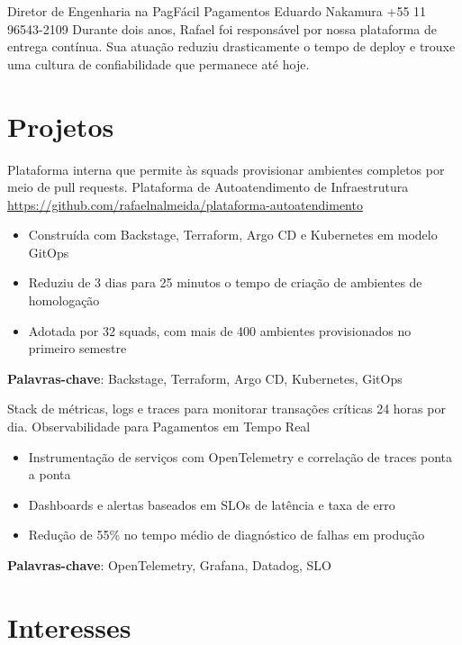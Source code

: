 \documentclass[a4paper, serif, 10pt]{moderncv}
\begin{document}
        {Diretor de Engenharia na PagFácil Pagamentos}
        {Eduardo Nakamura}
        {+55 11 96543-2109}
        {}
        {Durante dois anos, Rafael foi responsável por nossa plataforma de entrega contínua. Sua atuação reduziu drasticamente o tempo de deploy e trouxe uma cultura de confiabilidade que permanece até hoje.}
\section{Projetos}

        {Plataforma interna que permite às squads provisionar ambientes completos por meio de pull requests.}
        {Plataforma de Autoatendimento de Infraestrutura}
        {\url{https://github.com/rafaelnalmeida/plataforma-autoatendimento}}
        {}
        {\begin{itemize}
\item Construída com Backstage, Terraform, Argo CD e Kubernetes em modelo GitOps
\item Reduziu de 3 dias para 25 minutos o tempo de criação de ambientes de homologação
\item Adotada por 32 squads, com mais de 400 ambientes provisionados no primeiro semestre
\end{itemize}
\textbf{Palavras-chave}: Backstage, Terraform, Argo CD, Kubernetes, GitOps}

        {Stack de métricas, logs e traces para monitorar transações críticas 24 horas por dia.}
        {Observabilidade para Pagamentos em Tempo Real}
        {}
        {}
        {\begin{itemize}
\item Instrumentação de serviços com OpenTelemetry e correlação de traces ponta a ponta
\item Dashboards e alertas baseados em SLOs de latência e taxa de erro
\item Redução de 55\% no tempo médio de diagnóstico de falhas em produção
\end{itemize}
\textbf{Palavras-chave}: OpenTelemetry, Grafana, Datadog, SLO}
\section{Interesses}

\end{document}
